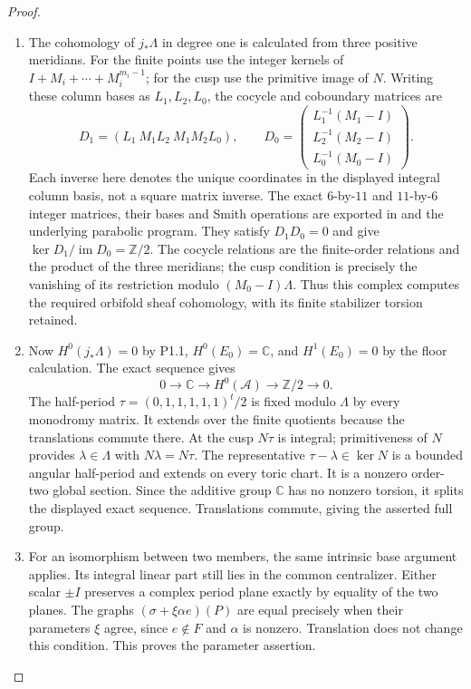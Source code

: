 \documentclass[11pt,a4paper]{article}
\theoremstyle{definition}
\DeclareMathOperator{\im}{im}\DeclareMathOperator{\coker}{coker}\DeclareMathOperator{\rank}{rank}\DeclareMathOperator{\diag}{diag}
\begin{document}
\begin{proof}
\begin{enumerate}[label=\arabic*.]
\item The cohomology of $j_*\Lambda$ in degree one is calculated
from three positive meridians. For the finite points use
the integer kernels of $I+M_i+\cdots+M_i^{m_i-1}$;
for the cusp use the primitive image of $N$.
Writing these column bases as $L_1,L_2,L_0$, the cocycle
and coboundary matrices are
\[
D_1=(L_1\ M_1L_2\ M_1M_2L_0),\qquad
D_0=\begin{pmatrix}L_1^{-1}(M_1-I)\\
L_2^{-1}(M_2-I)\\L_0^{-1}(M_0-I)\end{pmatrix}.
\]
Each inverse here denotes the unique coordinates in the
displayed integral column basis, not a square matrix
inverse. The exact $6$-by-$11$ and $11$-by-$6$ integer
matrices, their bases and Smith operations are exported
in  and the
underlying parabolic program. They satisfy $D_1D_0=0$ and
give $\ker D_1/\im D_0=\mathbb Z/2$. The cocycle relations
are the finite-order relations and the product of the
three meridians; the cusp condition is precisely the
vanishing of its restriction modulo $(M_0-I)\Lambda$.
Thus this complex computes the required orbifold sheaf
cohomology, with its finite stabilizer torsion retained.

\item Now $H^0(j_*\Lambda)=0$ by P1.1,
$H^0(E_0)=\mathbb C$, and $H^1(E_0)=0$ by the floor
calculation. The exact sequence gives
\[
0\to\mathbb C\to H^0(\mathcal A)\to\mathbb Z/2\to0.
\]
The half-period
$\tau=(0,1,1,1,1,1)^t/2$ is fixed modulo $\Lambda$
by every monodromy matrix. It extends over the finite
quotients because the translations commute there.
At the cusp $N\tau$ is integral; primitiveness of $N$
provides $\lambda\in\Lambda$ with $N\lambda=N\tau$.
The representative $\tau-\lambda\in\ker N$ is a bounded
angular half-period and extends on every toric chart.
It is a nonzero order-two global section. Since the
additive group $\mathbb C$ has no nonzero torsion, it
splits the displayed exact sequence. Translations
commute, giving the asserted full group.

\item For an isomorphism between two members, the same intrinsic
base argument applies. Its integral linear part still
lies in the common centralizer. Either scalar $\pm I$
preserves a complex period plane exactly by equality
of the two planes. The graphs
$(\sigma+\xi\alpha e)(P)$ are equal precisely when their
parameters $\xi$ agree, since $e\notin F$ and $\alpha$
is nonzero. Translation does not change this condition.
This proves the parameter assertion.

\end{enumerate}
\end{proof}
\end{document}
